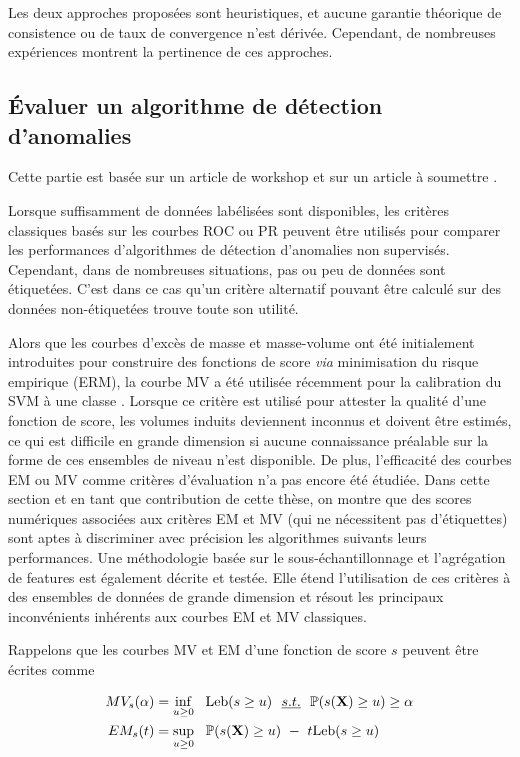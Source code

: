 Les deux approches proposées sont heuristiques, et aucune garantie théorique de consistence ou de taux de convergence n'est dérivée. Cependant, de nombreuses expériences montrent la pertinence de ces approches.

\subsection{Évaluer un algorithme de détection d'anomalies}
\label{resume_fr:evaluation}
Cette partie est basée sur un article de workshop \citep{ICMLworkshop16} et sur un article à soumettre \citep{NIPS16evaluation}.


Lorsque suffisamment de données labélisées sont disponibles, les critères classiques basés sur les courbes ROC \citep{Provost1997, Provost1998, Fawcett2006} ou PR \citep{Davis2006, Clemencon2009} peuvent être utilisés pour comparer les performances d'algorithmes de détection d'anomalies non supervisés. Cependant, dans de nombreuses situations, pas ou peu de données sont étiquetées. C'est dans ce cas qu'un critère alternatif pouvant être calculé sur des données non-étiquetées trouve toute son utilité.

Alors que les courbes d'excès de masse et masse-volume ont été initialement introduites pour construire des fonctions de score \emph{via} minimisation du risque empirique (ERM), la courbe MV a été utilisée récemment pour la calibration du SVM à une classe \citep{Thomas2015}.
Lorsque ce critère est utilisé pour attester la qualité d'une fonction de score, les volumes induits deviennent inconnus et doivent être estimés, ce qui est difficile en grande dimension si aucune connaissance préalable sur la forme de ces ensembles de niveau n'est disponible.
%
De plus, l'efficacité des courbes EM ou MV comme critères d'évaluation n'a pas encore été étudiée.
%
Dans cette section et en tant que contribution de cette thèse, on montre que des scores numériques associées aux critères EM et MV (qui ne nécessitent pas d'étiquettes) sont aptes à discriminer avec précision les algorithmes suivants leurs performances.
%
Une méthodologie basée sur le sous-échantillonnage et l'agrégation de features est également décrite et testée. Elle étend l'utilisation de ces critères à des ensembles de données de grande dimension et résout les principaux inconvénients inhérents aux courbes EM et MV classiques.

Rappelons que les courbes MV et EM d'une fonction de score $s$ peuvent être écrites comme

\begin{align}
\label{resume_fr:intro:MV-def}
 MV_s(\alpha) &= \inf_{u \ge 0}~~ \text{Leb}(s \ge u) ~~\emph{s.t.}{}~~\mathbb{P}(s(\mathbf X) \ge u) \ge \alpha\\
\label{resume_fr:intro:EM-def}
 EM_s(t) &= \sup_{u \ge 0}~~ \mathbb{P}(s(\mathbf X) \ge u) ~-~ t \text{Leb}(s \ge u)
\end{align}

